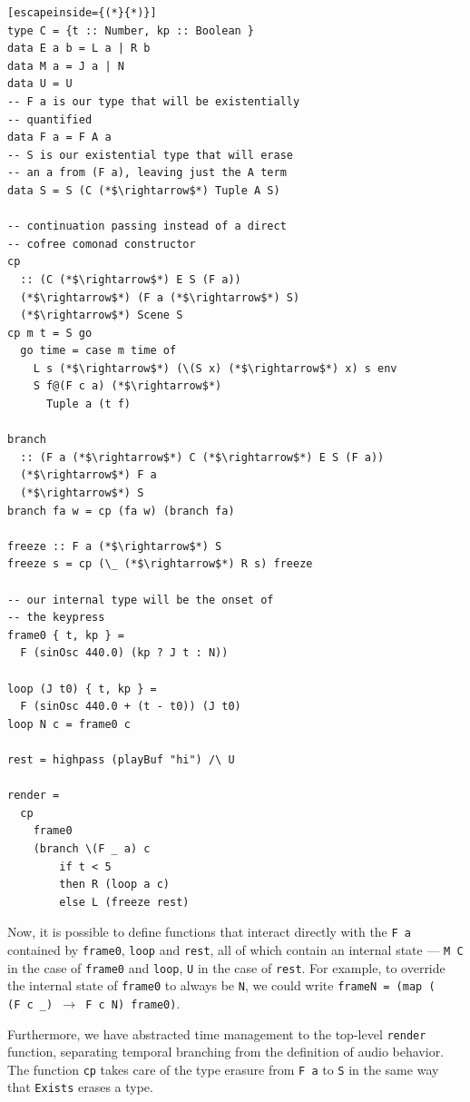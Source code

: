 \documentclass{article}
\begin{document}
\lstset{language=Haskell, style=psstyle}
\begin{lstlisting}[escapeinside={(*}{*)}]
type C = {t :: Number, kp :: Boolean }
data E a b = L a | R b
data M a = J a | N
data U = U
-- F a is our type that will be existentially
-- quantified
data F a = F A a
-- S is our existential type that will erase
-- an a from (F a), leaving just the A term
data S = S (C (*$\rightarrow$*) Tuple A S)

-- continuation passing instead of a direct
-- cofree comonad constructor
cp
  :: (C (*$\rightarrow$*) E S (F a))
  (*$\rightarrow$*) (F a (*$\rightarrow$*) S)
  (*$\rightarrow$*) Scene S
cp m t = S go
  go time = case m time of
    L s (*$\rightarrow$*) (\(S x) (*$\rightarrow$*) x) s env
    S f@(F c a) (*$\rightarrow$*)
      Tuple a (t f)

branch
  :: (F a (*$\rightarrow$*) C (*$\rightarrow$*) E S (F a))
  (*$\rightarrow$*) F a
  (*$\rightarrow$*) S
branch fa w = cp (fa w) (branch fa)

freeze :: F a (*$\rightarrow$*) S
freeze s = cp (\_ (*$\rightarrow$*) R s) freeze

-- our internal type will be the onset of
-- the keypress
frame0 { t, kp } =
  F (sinOsc 440.0) (kp ? J t : N))

loop (J t0) { t, kp } =
  F (sinOsc 440.0 + (t - t0)) (J t0)
loop N c = frame0 c

rest = highpass (playBuf "hi") /\ U

render =
  cp
    frame0
    (branch \(F _ a) c
        if t < 5
        then R (loop a c)
        else L (freeze rest)
\end{lstlisting}

Now, it is possible to define functions that interact directly with the \texttt{F a} contained by \texttt{frame0}, \texttt{loop} and \texttt{rest}, all of which contain an internal state --- \texttt{M C} in the case of \texttt{frame0} and \texttt{loop}, \texttt{U} in the case of \texttt{rest}. For example, to override the internal state of \texttt{frame0} to always be \texttt{N}, we could write \texttt{frameN = (map (\\(F c \_) $\rightarrow$ F c N) frame0)}.

Furthermore, we have abstracted time management to the top-level \texttt{render} function, separating temporal branching from the definition of audio behavior. The function \texttt{cp} takes care of the type erasure from \texttt{F a} to \texttt{S} in the same way that \texttt{Exists} erases a type.
\end{document}
